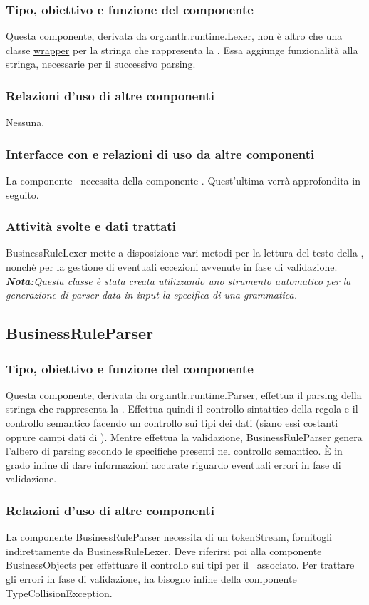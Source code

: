 \subsubsection{Tipo, obiettivo e funzione del componente}
Questa componente, derivata da org.antlr.runtime.Lexer, non \`e altro che una classe \underline{wrapper} per la stringa che rappresenta la \br. Essa aggiunge funzionalit\`a alla stringa, necessarie per il successivo parsing.
\subsubsection{Relazioni d'uso di altre componenti}
Nessuna.
\subsubsection{Interfacce con e relazioni di uso da altre componenti}
La componente \brp\ necessita della componente \brl. Quest'ultima verr\`a approfondita in seguito.
\subsubsection{Attivit\`a svolte e dati trattati}
BusinessRuleLexer mette a disposizione vari metodi per la lettura del testo della \br, nonch\`e per la gestione di eventuali eccezioni avvenute in fase di validazione.\\
\textit{\textbf{Nota:}Questa classe \`e stata creata utilizzando uno strumento automatico per la generazione di parser data in input la specifica di una grammatica.}

\subsection{BusinessRuleParser}
\subsubsection{Tipo, obiettivo e funzione del componente}
Questa componente, derivata da org.antlr.runtime.Parser, effettua il parsing della stringa che rappresenta la \br. Effettua quindi il controllo sintattico della regola e il controllo semantico facendo un controllo sui tipi dei dati (siano essi costanti oppure campi dati di \bos). Mentre effettua la validazione, BusinessRuleParser genera l'albero di parsing secondo le specifiche presenti nel controllo semantico. \`E in grado infine di dare informazioni accurate riguardo eventuali errori in fase di validazione.
\subsubsection{Relazioni d'uso di altre componenti}
La componente BusinessRuleParser necessita di un \underline{token}Stream, fornitogli indirettamente da BusinessRuleLexer. Deve riferirsi poi alla componente BusinessObjects per effettuare il controllo sui tipi per il \bo\ associato. Per trattare gli errori in fase di validazione, ha bisogno infine della componente TypeCollisionException.
